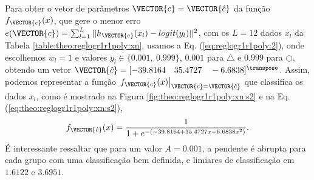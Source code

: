 \begin{SolutionT}\label{sol:theo:reglogr1r1poly:s2}
Para obter o vetor de parâmetros $\VECTOR{c}=\VECTOR{\hat{c}}$ da função $f_{\VECTOR{c}}(x)$, 
que gere o menor erro $e(\VECTOR{c}) =   \sum_{l=1}^{L} ||h_{\VECTOR{c}}(x_l)-logit(y_l)||^2$,
com os $L=12$ dados $x_l$ da Tabela \ref{table:theo:reglogr1r1poly:xn},
usamos a Eq. (\ref{eq:reglogr1r1poly:2}), onde escolhemos $w_l=1$ e valores $y_l \in \{0.001,~ 0.999\}$,
$0.001$ para $\bigtriangleup$ e $0.999$ para $\bigcirc$,
obtendo um vetor $\VECTOR{\hat{c}}=[-39.8164\quad 35.4727\quad -6.6838]^{\transpose}$. 
Assim, podemos representar a função $\left.f_{\VECTOR{c}}(x)\right|_{\VECTOR{c}=\VECTOR{\hat{c}}}$ 
que classifica os dados $x_l$, 
como é mostrado na Figura \ref{fig:theo:reglogr1r1poly:xn:s2} e na Eq. (\ref{eq:theo:reglogr1r1poly:xn:s2}),
\begin{equation}\label{eq:theo:reglogr1r1poly:xn:s2}
f_{\VECTOR{\hat{c}}}(x)= \frac{1}{1+e^{-(-39.8164+35.4727 x -6.6838 x^2)}}.
\end{equation}
É interessante ressaltar que para um valor $A=0.001$, 
a pendente é abrupta para cada grupo com uma classificação bem definida,
e limiares de classificação em $1.6122$ e $3.6951$.
\end{SolutionT}
